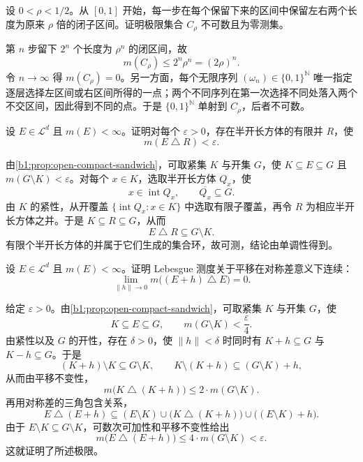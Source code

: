 \begin{exercise}\label{b1:ex:0303}
设 \(0<\rho<1/2\)。从 \([0,1]\) 开始，每一步在每个保留下来的区间中保留左右两个长度为原来 \(\rho\) 倍的闭子区间。证明极限集合 \(C_\rho\) 不可数且为零测集。
\end{exercise}
\begin{solution}
第 \(n\) 步留下 \(2^n\) 个长度为 \(\rho^n\) 的闭区间，故
\[
m(C_\rho)\leq 2^n\rho^n=(2\rho)^n.
\]
令 \(n\to\infty\) 得 \(m(C_\rho)=0\)。另一方面，每个无限序列 \((\omega_n)\in\{0,1\}^{\mathbb N}\) 唯一指定逐层选择左区间或右区间所得的一点；两个不同序列在第一次选择不同处落入两个不交区间，因此得到不同的点。于是 \(\{0,1\}^{\mathbb N}\) 单射到 \(C_\rho\)，后者不可数。
\end{solution}

\begin{exercise}\label{b1:ex:0304}
设 \(E\in\mathcal L^d\) 且 \(m(E)<\infty\)。证明对每个 \(\varepsilon>0\)，存在半开长方体的有限并 \(R\)，使
\[
m(E\mathbin{\triangle}R)<\varepsilon.
\]
\end{exercise}
\begin{solution}
由\cref{b1:prop:open-compact-sandwich}，可取紧集 \(K\) 与开集 \(G\)，使 \(K\subseteq E\subseteq G\) 且 \(m(G\setminus K)<\varepsilon\)。对每个 \(x\in K\)，选取半开长方体 \(Q_x\)，使
\[
 x\in\operatorname{int}Q_x,
 \qquad \overline{Q_x}\subseteq G.
\]
由 \(K\) 的紧性，从开覆盖 \(\{\operatorname{int}Q_x:x\in K\}\) 中选取有限子覆盖，再令 \(R\) 为相应半开长方体之并。于是 \(K\subseteq R\subseteq G\)，从而
\[
E\mathbin{\triangle}R\subseteq G\setminus K.
\]
有限个半开长方体的并属于它们生成的集合环，故可测，结论由单调性得到。
\end{solution}

\begin{exercise}\label{b1:ex:0305}
设 \(E\in\mathcal L^d\) 且 \(m(E)<\infty\)。证明 Lebesgue 测度关于平移在对称差意义下连续：
\[
\lim_{\lVert h\rVert\to0}m\bigl((E+h)\mathbin{\triangle}E\bigr)=0.
\]
\end{exercise}
\begin{solution}
给定 \(\varepsilon>0\)。由\cref{b1:prop:open-compact-sandwich}，可取紧集 \(K\) 与开集 \(G\)，使
\[
K\subseteq E\subseteq G,
\qquad
m(G\setminus K)<\frac{\varepsilon}{4}.
\]
由紧性以及 \(G\) 的开性，存在 \(\delta>0\)，使 \(\lVert h\rVert<\delta\) 时同时有 \(K+h\subseteq G\) 与 \(K-h\subseteq G\)。于是
\[
(K+h)\setminus K\subseteq G\setminus K,
\qquad
K\setminus(K+h)\subseteq(G\setminus K)+h,
\]
从而由平移不变性，
\[
m\bigl(K\mathbin{\triangle}(K+h)\bigr)
\leq 2\cdot m(G\setminus K).
\]
再用对称差的三角包含关系，
\[
E\mathbin{\triangle}(E+h)
\subseteq(E\setminus K)
\cup\bigl(K\mathbin{\triangle}(K+h)\bigr)
\cup\bigl((E\setminus K)+h\bigr).
\]
由于 \(E\setminus K\subseteq G\setminus K\)，可数次可加性和平移不变性给出
\[
m\bigl(E\mathbin{\triangle}(E+h)\bigr)
\leq4\cdot m(G\setminus K)<\varepsilon.
\]
这就证明了所述极限。
\end{solution}

